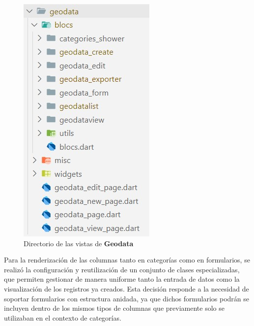 \documentclass[12pt, a4paper]{book}
\begin{document}
\begin{figure}[H]
\begin{minipage}[b]{0.3\textwidth}
    \includegraphics[width=\textwidth]{images/goedata_page.jpg}
    \caption{Directorio de las vistas de \textbf{Geodata}}
    \label{fig:geodatapage}
  \end{minipage}
\end{figure}

Para la renderización de las columnas tanto en categorías como en formularios, se realizó la configuración y reutilización de un conjunto de clases especializadas, que permiten gestionar de manera uniforme tanto la entrada de datos como la visualización de los registros ya creados. Esta decisión responde a la necesidad de soportar formularios con estructura anidada, ya que dichos formularios podrán se incluyen dentro de los mismos tipos de columnas que previamente solo se utilizaban en el contexto de categorías.
\end{document}
